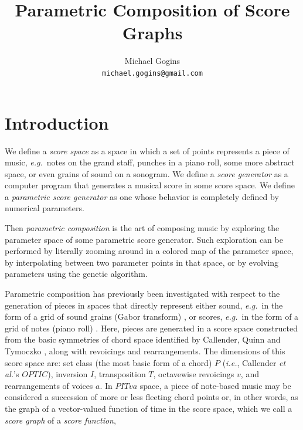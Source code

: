 \documentclass[english,11pt,letterpaper,onecolumn]{scrartcl}
\numberwithin{equation}{section}
\begin{document}
    
    \title{Parametric Composition of Score Graphs}
    \author{Michael Gogins \\ \texttt{michael.gogins@gmail.com}}
    \maketitle
    
    
    \section{Introduction}
    
    We define a \textit{score space} as a space in which a set of points 
represents 
    a piece of music, \textit{e.g.}\ notes on the grand staff, punches in a 
piano 
    roll, some more abstract space, or even grains of sound on a sonogram. We 
    define a \textit{score generator} as a computer program that generates a 
    musical score in some score space. We define a \textit{parametric score 
        generator} as one whose behavior is completely defined by numerical 
    parameters. 
    
    Then \textit{parametric composition} is the art of composing music by 
exploring 
    the parameter space of some parametric score generator. Such exploration 
can be 
    performed by literally zooming around in a colored map of the parameter 
space, 
    by interpolating between two parameter points in that space, or by 
evolving 
    parameters using the genetic algorithm. 
    
    Parametric composition has previously been investigated with respect to 
the 
    generation of pieces in spaces that directly represent either sound, 
    \textit{e.g.}\ in the form of a grid of sound grains (Gabor transform) 
    \cite{obsessed}, or scores, \textit{e.g.}\ in the form of a grid of notes 
(piano 
    roll) \cite{ifsmusic}. Here, pieces are generated in a score space 
constructed 
    from the basic symmetries of chord space identified by Callender, Quinn 
and 
    Tymoczko \cite{callender:346}, along with revoicings and rearrangements. 
The 
    dimensions of this score space are: set class (the most basic form of a 
chord) 
    $P$ (\textit{i.e.}, Callender \textit{et al.}'s $OPTIC$), inversion $I$, 
    transposition $T$, octavewise revoicings $v$, and rearrangements of voices 
$a$. 
    In $PITva$ space, a piece of note-based music may be considered a 
succession of 
    more or less fleeting chord points or, in other words, as the graph of a 
    vector-valued function of time in the score space, which we call a 
    \textit{score graph} of a \textit{score function},
    
\end{document}
